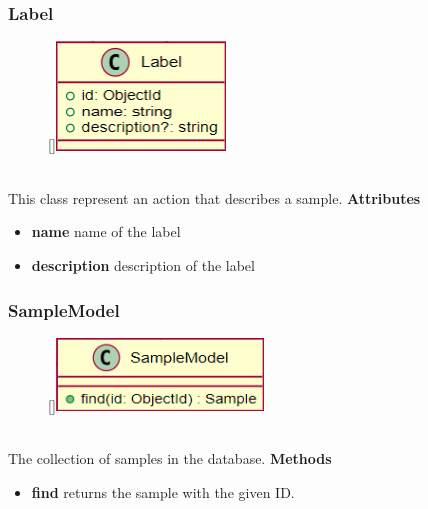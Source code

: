 \newpage
\subsubsection{Label}
\label{Label}
\begin{figure}
    \raisebox{0pt}[\dimexpr{}\baselineskip\relax]{\includegraphics[width=4.5cm]{classes/workspace-management/5.png}}
\end{figure} 
~\\
This class represent an action that describes a sample.
\newline
\newline
\newline
\newline
\newline
\newline
\textbf{Attributes}
\begin{itemize}
    \item \textbf{name} name of the label
    \item \textbf{description} description of the label
\end{itemize}

\subsubsection{SampleModel}
\label{SampleModel}
\begin{figure}
    \raisebox{0pt}[\dimexpr{}\baselineskip\relax]{\includegraphics[width=5.5cm]{classes/workspace-management/6.png}}
\end{figure} 
~\\
The collection of samples in the database.
\newline
\newline
\newline
\newline
\newline
\textbf{Methods}
\begin{itemize}
    \item \textbf{find} returns the sample with the given ID.
\end{itemize}

